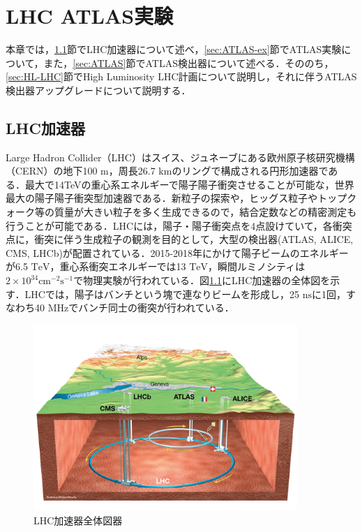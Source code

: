 \chapter{LHC ATLAS実験}
本章では，\ref{sec:LHC}節でLHC加速器について述べ，\ref{sec:ATLAS-ex}節でATLAS実験について，また，\ref{sec:ATLAS}節でATLAS検出器について述べる．そののち，\ref{sec:HL-LHC}節でHigh Luminosity LHC計画について説明し，それに伴うATLAS検出器アップグレードについて説明する．\par
\section{LHC加速器}
\label{sec:LHC}
Large Hadron Collider（LHC）はスイス、ジュネーブにある欧州原子核研究機構（CERN）の地下100 $\mathrm{m}$，周長26.7 $\mathrm{km}$のリングで構成される円形加速器である．最大で14TeVの重心系エネルギーで陽子陽子衝突させることが可能な，世界最大の陽子陽子衝突型加速器である．新粒子の探索や，ヒッグス粒子やトップクォーク等の質量が大きい粒子を多く生成できるので，結合定数などの精密測定も行うことが可能である．LHCには，陽子・陽子衝突点を4点設けていて，各衝突点に，衝突に伴う生成粒子の観測を目的として，大型の検出器(ATLAS, ALICE, CMS, LHCb)が配置されている．2015-2018年にかけて陽子ビームのエネルギーが6.5 $\mathrm{TeV}$，重心系衝突エネルギーでは13 $\mathrm{TeV}$，瞬間ルミノシティは$2\times 10^{34} \mathrm{cm^{-2}s^{-1}}$で物理実験が行われている．図\ref{fig:LHC}にLHC加速器の全体図を示す．LHCでは，陽子はバンチという塊で連なりビームを形成し，25 $\mathrm{ns}$に1回，すなわち40 $\mathrm{MHz}$でバンチ同士の衝突が行われている．\par

\begin{figure}[h]
  \centering
  \includegraphics[width=10cm]{./figure/LHC.png}
  \caption{LHC加速器全体図器\cite{Collaboration_2008}}
  \label{fig:LHC}
\end{figure}

